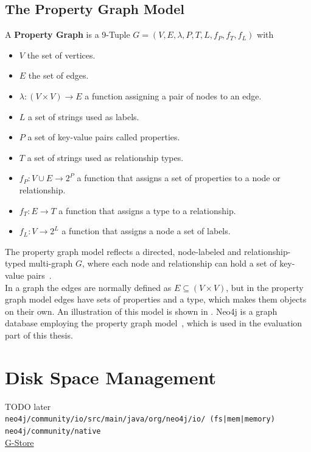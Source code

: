 \documentclass[a4paper,10pt]{article}
\begin{document}
    \subsection{The Property Graph Model}\label{\positionnumber}
A \textbf{Property Graph} is a 9-Tuple $G = (V, E, \lambda, P, T, L, f_P, f_T, f_L)$ with 
\begin{itemize}
    \item $V$ the set of vertices.
    \item $E$ the set of edges.
    \item $\lambda: (V \times V) \rightarrow E$ a function assigning a pair of nodes to an edge.
    \item $L$ a set of strings used as labels.
    \item $P$ a set of key-value pairs called properties.
    \item $T$ a set of strings used as relationship types.
    \item $f_P: V \cup E \rightarrow 2^P$ a function that assigns a set of properties to a node or relationship.
   \item $f_T: E \rightarrow T$ a function that assigns a type to  a relationship.
   \item  $f_L: V \rightarrow 2^L$ a function that assigns a node a set of labels.
\end{itemize} 
\smallskip
The property graph model reflects a directed, node-labeled and relationship-typed multi-graph $G$, where each node and relationship can hold a set of key-value pairs~\cite{angles2018property}. \\
    In a graph the edges are normally defined as $E \subseteq (V \times V)$, but in the property graph model edges have sets of properties and a type, which makes them objects on their own.
    An illustration of this model is shown in .
Neo4j is a graph database employing the property graph model~\cite{neo4j_book}, which is used in the evaluation part of this thesis.


\newpage


\section{Disk Space Management}
    TODO later \\
    \texttt{neo4j/community/io/src/main/java/org/neo4j/io/ (fs|mem|memory)} \\
    \texttt{neo4j/community/native} \\
    \href{http://g-store.sourceforge.net/th/index.htm}{G-Store} \\
\end{document}
